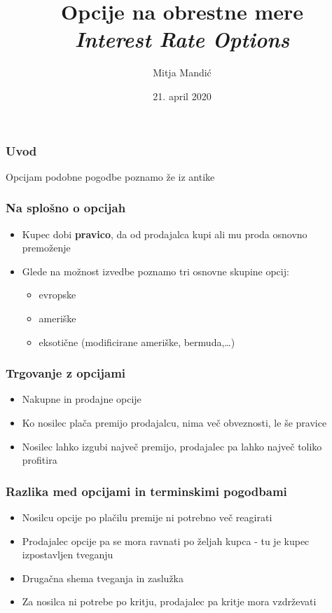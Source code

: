 \documentclass[14pt]{beamer}
\begin{document}
\title{Opcije na obrestne mere \\ \textit{Interest Rate Options}}
\author{Mitja Mandić}
\date{21. april 2020}

\begin{frame}
    \titlepage
\end{frame}

\begin{frame}
    \frametitle{Uvod}
    Opcijam podobne pogodbe poznamo že iz antike
\end{frame}

\begin{frame}
    \frametitle{Na splošno o opcijah}
    \begin{itemize}
        \item Kupec dobi \textbf{pravico}, da od prodajalca kupi 
        ali mu proda osnovno premoženje
        \item Glede na možnost izvedbe poznamo tri osnovne skupine opcij:
        \pause
        \begin{itemize}
            \item evropske
            \pause
            \item ameriške
            \pause
            \item eksotične (modificirane ameriške, bermuda,\ldots)
        \end{itemize}
    \end{itemize}
\end{frame}

\begin{frame}
    \frametitle{Trgovanje z opcijami}
    \begin{itemize}
        \item Nakupne in prodajne opcije
        \item Ko nosilec plača premijo prodajalcu, nima več obveznosti, le še pravice
        \item Nosilec lahko izgubi največ premijo, prodajalec pa lahko največ toliko profitira
    \end{itemize}
\end{frame}

\begin{frame}
    \frametitle{Razlika med opcijami in terminskimi pogodbami}
    \begin{itemize}
        \item Nosilcu opcije po plačilu premije ni potrebno več reagirati
        \item Prodajalec opcije pa se mora ravnati po željah kupca - tu je kupec izpostavljen tveganju
        \item Drugačna shema tveganja in zaslužka
        \item Za nosilca ni potrebe po kritju, prodajalec pa kritje mora vzdrževati
    \end{itemize}
\end{frame}
\end{document}
